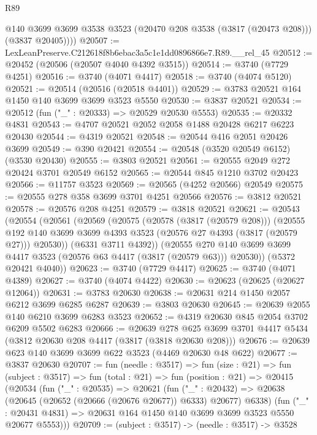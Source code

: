 \begin{lexlean}{R89}
\begin{coremodule}
          @140
          @3699
          @3699
          @3538
          @3523
          (@20470 @208 @3538 (@3817 (@20473 @208)))
          (@3837 @20405))))
@20507 := LexLeanPreserve.C212618f8b6ebac3a5c1e1dd0896866e7.R89.__rel_45
@20512 := @20452 (@20506 (@20507 @4040 @4392 @3515))
@20514 := @3740 (@7729 @4251)
@20516 := @3740 (@4071 @4417)
@20518 := @3740 (@4074 @5120)
@20521 := @20514 (@20516 (@20518 @4401))
@20529 := @3783 @20521 @164 @1450 @140 @3699 @3699 @3523 @5550
@20530 := @3837 @20521
@20534 := @20512 (fun ("_" : @20333) => @20529 @20530 @5553)
@20535 := @20332 @4831
@20543 := @4707 @20521 @2052 @2058 @1488 @20428 @6217 @6223 @20430
@20544 := @4319 @20521
@20548 := @20544 @416 @2051 @20426 @3699
@20549 := @390 @20421
@20554 := @20548 (@3520 @20549 @6152) (@3530 @20430)
@20555 := @3803 @20521
@20561 := @20555 @2049 @272 @20424 @3701 @20549 @6152
@20565 := @20544 @845 @1210 @3702 @20423
@20566 := @11757 @3523
@20569 := @20565 (@4252 @20566) @20549
@20575 := @20555 @278 @358 @3699 @3701 @4251 @20566
@20576 := @3812 @20521
@20578 := @20576 @208 @4251
@20579 := @3818 @20521
@20621 := @20543
    (@20554
      (@20561
        (@20569
          (@20575
            (@20578 (@3817 (@20579 @208)))
            (@20555
              @192
              @140
              @3699
              @3699
              @4393
              @3523
              (@20576 @27 @4393 (@3817 (@20579 @27)))
              @20530))
          (@6331 @3711 @4392))
        (@20555 @270 @140 @3699 @3699 @4417 @3523 (@20576 @63 @4417 (@3817 (@20579 @63))) @20530))
      (@5372 @20421 @4040))
@20623 := @3740 (@7729 @4417)
@20625 := @3740 (@4071 @4389)
@20627 := @3740 (@4074 @4422)
@20630 := @20623 (@20625 (@20627 @12064))
@20631 := @3783 @20630
@20638 := @20631 @214 @1450 @2057 @6212 @3699 @6285 @6287
@20639 := @3803 @20630
@20645 := @20639 @2055 @140 @6210 @3699 @6283 @3523
@20652 := @4319 @20630 @845 @2054 @3702 @6209 @5502 @6283
@20666 := @20639
    @278
    @625
    @3699
    @3701
    @4417
    @5434
    (@3812 @20630 @208 @4417 (@3817 (@3818 @20630 @208)))
@20676 := @20639 @623 @140 @3699 @3699 @622 @3523 (@4469 @20630 @48 @622)
@20677 := @3837 @20630
@20707 := fun (needle : @3517) =>
  fun (size : @21) =>
  fun (subject : @3517) =>
  fun (total : @21) =>
  fun (position : @21) =>
  @20415
    (@20534
      (fun ("_" : @20535) =>
      @20621
        (fun ("_" : @20432) => @20638 (@20645 (@20652 (@20666 (@20676 @20677)) @6333) @20677) @6338)
        (fun ("_" : @20431 @4831) => @20631 @164 @1450 @140 @3699 @3699 @3523 @5550 @20677 @5553)))
@20709 := (subject : @3517) -> (needle : @3517) -> @3528

\end{coremodule}
\end{lexlean}
